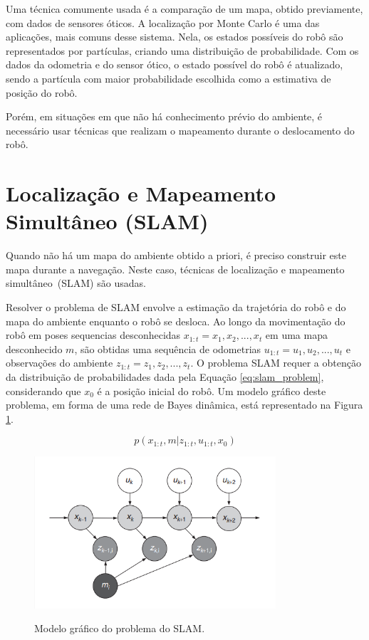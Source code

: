 \documentclass[repeatfields,xlists,xpacks,oneside,yearsonly]{ufrgscca}
\begin{document}
Uma técnica comumente usada é a comparação de um mapa, obtido
previamente, com dados de sensores óticos. A localização por Monte
Carlo é uma das aplicações, mais comuns desse sistema. Nela, os
estados possíveis do robô são representados por partículas, criando
uma distribuição de probabilidade. Com os dados da odometria e do
sensor ótico, o estado possível do robô é atualizado, sendo a
partícula com maior probabilidade escolhida como a estimativa de
posição do robô.

Porém, em situações em que não há conhecimento prévio do ambiente, é
necessário usar técnicas que realizam o mapeamento durante o
deslocamento do robô.

\section{Localização e Mapeamento Simultâneo (SLAM)}

Quando não há um mapa do ambiente obtido a priori, é preciso
construir este mapa durante a navegação. Neste caso, técnicas de
localização e mapeamento simultâneo~(SLAM) são usadas.

Resolver o problema de SLAM envolve a estimação da trajetória do robô
e do mapa do ambiente enquanto o robô se desloca. Ao longo da
movimentação do robô em poses sequencias desconhecidas $x_{1:t} = {
            x_1, x_2, ..., x_t }$ em uma mapa desconhecido $m$, são obtidas uma
sequência de odometrias $u_{1:t} = {u_1, u_2, ..., u_t}$ e
observações do ambiente $z_{1:t} = {z_1, z_2, ..., z_t}$. O problema
SLAM requer a obtenção da distribuição de probabilidades dada pela
Equação \ref{eq:slam_problem}, considerando que $x_0$ é a posição
inicial do robô. Um modelo gráfico deste problema, em forma de uma
rede de Bayes dinâmica, está representado na Figura
\ref{fig:slam_algo}.

\begin{equation}
    \label{eq:slam_problem}
    p(x_{1:t}, m | z_{1:t}, u_{1:t}, x_0)
\end{equation}

\begin{figure}[h]
    {
        \centering
        \caption{Modelo gráfico do problema do SLAM.}
        \label{fig:slam_algo}
        \includegraphics[width=0.8\textwidth]{graphic_slam_representation.png}\\
    }
    {}
\end{figure}
\end{document}
